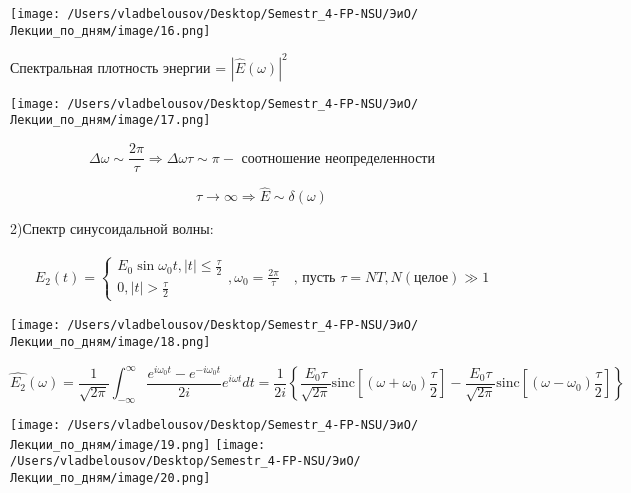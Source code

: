 \documentclass[12pt, a4paper]{report}
\begin{document}
\begin{center}
    \texttt{[image: /Users/vladbelousov/Desktop/Semestr\_4-FP-NSU/ЭиО/Лекции\_по\_дням/image/16.png]}
\end{center}

Спектральная плотность энергии = \( |\hat{E } (\omega)| ^2  \) 

\begin{center}
    \texttt{[image: /Users/vladbelousov/Desktop/Semestr\_4-FP-NSU/ЭиО/Лекции\_по\_дням/image/17.png]}
\end{center}

\[ \Delta \omega \sim  \frac{2 \pi}{ \tau} \Rightarrow \Delta \omega \tau \sim \pi - \text{ соотношение неопределенности}     \] 

\[ \tau \to  \infty \Rightarrow \hat{E } \sim  \delta ( \omega)  \] 



2)Спектр синусоидальной волны: 

\[ \begin{aligned}
    E_2 ( t) = \begin{cases}
        E_0 \sin  \omega_0 t , |t| \le \frac{\tau}{2} \\
        0 , |t| > \frac{\tau}{2}
    \end{cases}, 
    \omega_0 = \frac{2 \pi}{\tau} \quad \text{, пусть } \tau= N T , N(\text{целое} ) \gg 1 
\end{aligned} \] 

\begin{center}
    \texttt{[image: /Users/vladbelousov/Desktop/Semestr\_4-FP-NSU/ЭиО/Лекции\_по\_дням/image/18.png]}
\end{center}


\[ \hat{E_2 } ( \omega) = \frac{1}{ \sqrt{2 \pi}} \int_{-\infty}^{\infty} \frac{ e^{ i \omega_0 t } - e^{- i \omega_0 t} }{2 i} e^{i \omega t} dt  = \frac{1}{2i} \left\{ \frac{E_0 \tau}{\sqrt{2 \pi}}\mathrm{sinc} \left[ (\omega + \omega_0) \frac{\tau}{2}  \right] -    \frac{E_0 \tau}{\sqrt{2 \pi}}\mathrm{sinc} \left[ (\omega - \omega_0) \frac{\tau}{2}  \right]\right\}      \] 

\begin{center}
    \texttt{[image: /Users/vladbelousov/Desktop/Semestr\_4-FP-NSU/ЭиО/Лекции\_по\_дням/image/19.png]}
    \texttt{[image: /Users/vladbelousov/Desktop/Semestr\_4-FP-NSU/ЭиО/Лекции\_по\_дням/image/20.png]}
\end{center}
\end{document}
